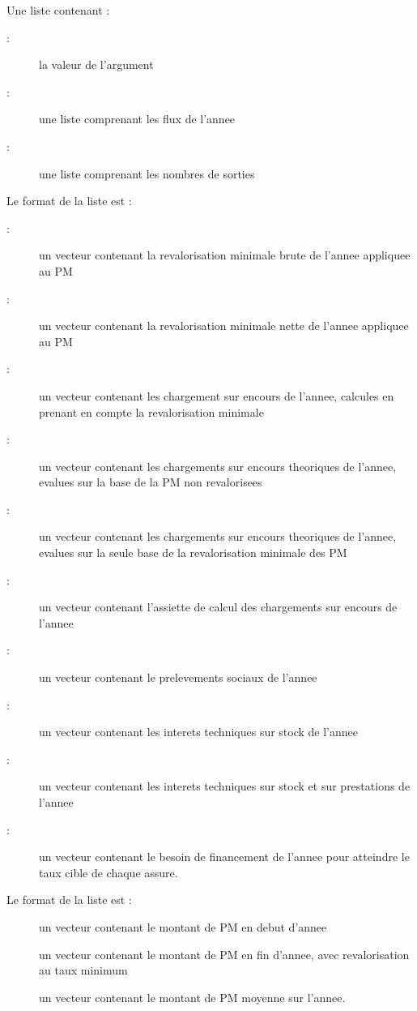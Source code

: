 \documentclass[a4paper]{book}
\begin{document}
%
\begin{Value}
Une liste contenant :
\begin{description}

\item[ : ] la valeur de l'argument 
\item[ : ] une liste comprenant les flux de l'annee
\item[ : ] une liste comprenant les nombres de sorties

\end{description}


Le format de la liste  est :
\begin{description}

\item[ : ] un vecteur contenant la revalorisation minimale
brute de l'annee appliquee au PM
\item[ : ] un vecteur contenant la revalorisation minimale
nette de l'annee appliquee au PM
\item[ : ] un vecteur contenant les chargement sur encours de l'annee,
calcules en prenant en compte la revalorisation minimale
\item[ : ] un vecteur contenant les chargements sur encours theoriques
de l'annee, evalues sur la base de la PM non revalorisees
\item[ : ] un vecteur contenant les chargements sur encours theoriques
de l'annee, evalues sur la seule base de la revalorisation minimale des PM
\item[ : ] un vecteur contenant l'assiette de calcul des chargements sur encours de l'annee
\item[ : ] un vecteur contenant le prelevements sociaux de l'annee
\item[ : ] un vecteur contenant les interets techniques sur stock de l'annee
\item[ : ] un vecteur contenant les interets techniques sur stock et
sur prestations de l'annee
\item[ : ] un vecteur contenant le besoin de financement de l'annee pour
atteindre le taux cible de chaque assure.

\end{description}


Le format de la liste  est :
\begin{description}

\item[] un vecteur contenant le montant de PM en debut d'annee
\item[] un vecteur contenant le montant de PM en fin d'annee, avec
revalorisation au taux minimum
\item[] un vecteur contenant le montant de PM moyenne sur l'annee.

\end{description}

\end{Value}
\end{document}
